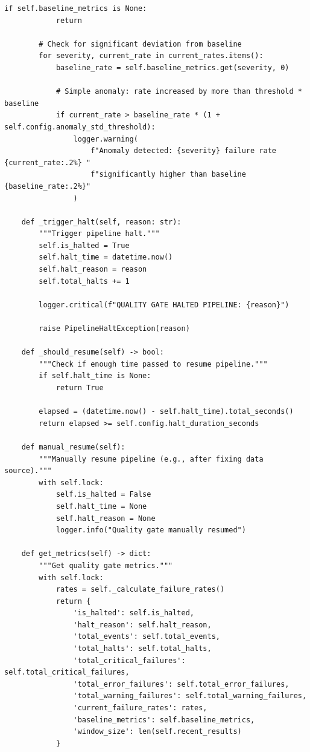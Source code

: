 \begin{lstlisting}[style=python, caption={Data Quality Gate Implementation}]
        if self.baseline_metrics is None:
            return

        # Check for significant deviation from baseline
        for severity, current_rate in current_rates.items():
            baseline_rate = self.baseline_metrics.get(severity, 0)

            # Simple anomaly: rate increased by more than threshold * baseline
            if current_rate > baseline_rate * (1 + self.config.anomaly_std_threshold):
                logger.warning(
                    f"Anomaly detected: {severity} failure rate {current_rate:.2%} "
                    f"significantly higher than baseline {baseline_rate:.2%}"
                )

    def _trigger_halt(self, reason: str):
        """Trigger pipeline halt."""
        self.is_halted = True
        self.halt_time = datetime.now()
        self.halt_reason = reason
        self.total_halts += 1

        logger.critical(f"QUALITY GATE HALTED PIPELINE: {reason}")

        raise PipelineHaltException(reason)

    def _should_resume(self) -> bool:
        """Check if enough time passed to resume pipeline."""
        if self.halt_time is None:
            return True

        elapsed = (datetime.now() - self.halt_time).total_seconds()
        return elapsed >= self.config.halt_duration_seconds

    def manual_resume(self):
        """Manually resume pipeline (e.g., after fixing data source)."""
        with self.lock:
            self.is_halted = False
            self.halt_time = None
            self.halt_reason = None
            logger.info("Quality gate manually resumed")

    def get_metrics(self) -> dict:
        """Get quality gate metrics."""
        with self.lock:
            rates = self._calculate_failure_rates()
            return {
                'is_halted': self.is_halted,
                'halt_reason': self.halt_reason,
                'total_events': self.total_events,
                'total_halts': self.total_halts,
                'total_critical_failures': self.total_critical_failures,
                'total_error_failures': self.total_error_failures,
                'total_warning_failures': self.total_warning_failures,
                'current_failure_rates': rates,
                'baseline_metrics': self.baseline_metrics,
                'window_size': len(self.recent_results)
            }


\end{lstlisting}
